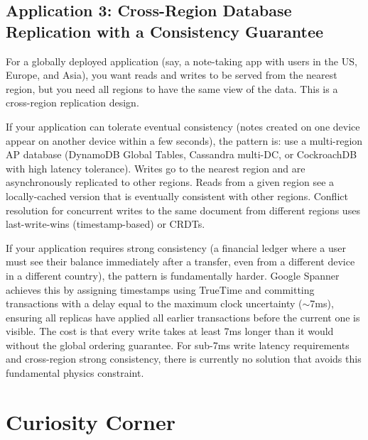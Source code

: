 \documentclass[11pt,a4paper]{article}
\begin{document}
\subsection{Application 3: Cross-Region Database Replication with a Consistency Guarantee}

For a globally deployed application (say, a note-taking app with users in the US, Europe, and Asia), you want reads and writes to be served from the nearest region, but you need all regions to have the same view of the data. This is a cross-region replication design.

If your application can tolerate eventual consistency (notes created on one device appear on another device within a few seconds), the pattern is: use a multi-region AP database (DynamoDB Global Tables, Cassandra multi-DC, or CockroachDB with high latency tolerance). Writes go to the nearest region and are asynchronously replicated to other regions. Reads from a given region see a locally-cached version that is eventually consistent with other regions. Conflict resolution for concurrent writes to the same document from different regions uses last-write-wins (timestamp-based) or CRDTs.

If your application requires strong consistency (a financial ledger where a user must see their balance immediately after a transfer, even from a different device in a different country), the pattern is fundamentally harder. Google Spanner achieves this by assigning timestamps using TrueTime and committing transactions with a delay equal to the maximum clock uncertainty ($\sim$7ms), ensuring all replicas have applied all earlier transactions before the current one is visible. The cost is that every write takes at least 7ms longer than it would without the global ordering guarantee. For sub-7ms write latency requirements and cross-region strong consistency, there is currently no solution that avoids this fundamental physics constraint.

\section{Curiosity Corner}
\end{document}
